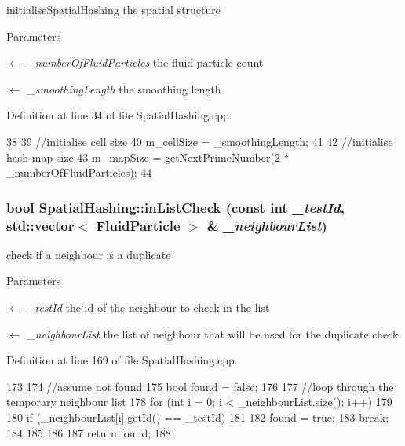 initialiseSpatialHashing the spatial structure 


\begin{DoxyParams}{Parameters}
\item[\mbox{$\leftarrow$} {\em \_\-numberOfFluidParticles}]the fluid particle count \item[\mbox{$\leftarrow$} {\em \_\-smoothingLength}]the smoothing length \end{DoxyParams}


Definition at line 34 of file SpatialHashing.cpp.




\begin{DoxyCode}
38 {
39     //initialise cell size
40     m_cellSize = _smoothingLength;
41 
42     //initialise hash map size
43     m_mapSize = getNextPrimeNumber(2 * _numberOfFluidParticles);
44 }
\end{DoxyCode}


\hypertarget{class_spatial_hashing_ac8700af92ae1d6729b29307926bd2a09}{
\subsubsection[{inListCheck}]{\setlength{\rightskip}{0pt plus 5cm}bool SpatialHashing::inListCheck (const int {\em \_\-testId}, \/  std::vector$<$ {\bf FluidParticle} $>$ \& {\em \_\-neighbourList})}}
\label{class_spatial_hashing_ac8700af92ae1d6729b29307926bd2a09}


check if a neighbour is a duplicate 


\begin{DoxyParams}{Parameters}
\item[\mbox{$\leftarrow$} {\em \_\-testId}]the id of the neighbour to check in the list \item[\mbox{$\leftarrow$} {\em \_\-neighbourList}]the list of neighbour that will be used for the duplicate check \end{DoxyParams}


Definition at line 169 of file SpatialHashing.cpp.




\begin{DoxyCode}
173 {
174     //assume not found
175     bool found = false;
176 
177     //loop through the temporary neighbour list
178     for (int i = 0; i < _neighbourList.size(); i++)
179     {
180         if (_neighbourList[i].getId() == _testId)
181         {
182             found = true;
183             break;
184         }
185     }
186 
187     return found;
188 }
\end{DoxyCode}


